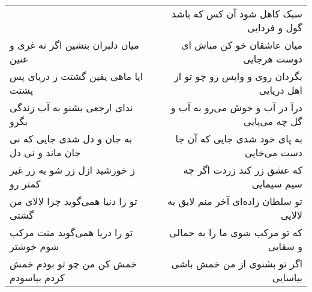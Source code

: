 \begin{center}
\begin{longtable}{l p{0.5cm} r}
&&
سبک کاهل شود آن کس که باشد گول و فردایی
\\
میان دلبران بنشین اگر نه غری و عنین
&&
میان عاشقان خو کن مباش ای دوست هرجایی
\\
ایا ماهی یقین گشتت ز دریای پس پشتت
&&
بگردان روی و واپس رو چو تو از اهل دریایی
\\
ندای ارجعی بشنو به آب زندگی بگرو
&&
درآ در آب و خوش می‌رو به آب و گل چه می‌پایی
\\
به جان و دل شدی جایی که نی جان ماند و نی دل
&&
به پای خود شدی جایی که آن جا دست می‌خایی
\\
ز خورشید ازل زر شو به زر غیر کمتر رو
&&
که عشق زر کند زردت اگر چه سیم سیمایی
\\
تو را دنیا همی‌گوید چرا لالای من گشتی
&&
تو سلطان زاده‌ای آخر منم لایق به لالایی
\\
تو را دریا همی‌گوید منت مرکب شوم خوشتر
&&
که تو مرکب شوی ما را به حمالی و سقایی
\\
خمش کن من چو تو بودم خمش کردم بیاسودم
&&
اگر تو بشنوی از من خمش باشی بیاسایی
\\
\end{longtable}
\end{center}
